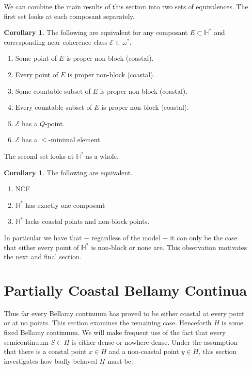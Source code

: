 \documentclass[12pt]{article}
\theoremstyle{plain}
\theoremstyle{definition}
\newtheorem{corollary}[theorem]{Corollary}
\newcommand{\W}{\ensuremath{\omega}}
\newcommand{\HH}{\ensuremath{\mathbb H}}
\newcommand{\0}{\ensuremath{\varnothing}}
\newcommand{\sE}{\ensuremath{\mathscr E}}
\newcommand{\cE}{\ensuremath{\mathcal E}}
\begin{document}
	We can combine the main results of this section into two sets of equivalences. The first set looks at each composant separately.
	
	\begin{corollary}
		The following are equivalent for any composant $E \subset \HH^*$ and corresponding near coherence class $\sE \subset \W^*$.
		\begin{enumerate}
			
			\item Some point of $E$ is proper non-block (coastal).
			
			\item Every point of $E$ is proper non-block (coastal).
			
			\item Some countable subset of $E$ is proper non-block (coastal).
			
			\item Every countable subset of $E$ is proper non-block (coastal).
			
			\item $\cE$ has a $Q$-point.
			
			\item $\cE$ has a $\le$-minimal element.
			
		\end{enumerate}
	\end{corollary}
	
	The second set looks at $\HH^*$ as a whole.
	
	\begin{corollary}
		The following are equivalent.
		\begin{enumerate}
			\item NCF
			\item $\HH^*$ has exactly one composant
			\item $\HH^*$ lacks coastal points and non-block points.
		\end{enumerate}
	\end{corollary}
	
	In particular we have that $-$ regardless of the model $-$ it can only be the case that either every point of $\HH^*$ is non-block or none are. This observation motivates the next and final section.
	
	

	
	\section{Partially Coastal Bellamy Continua}
	\noindent
	Thus far every Bellamy continuum has proved to be either coastal at every point or at no points. This section examines the remaining case. 
	Henceforth $H$ is some fixed Bellamy continuum. We will make frequent use of the fact that every semicontinuum $S \subset H$ is either dense or nowhere-dense. 
	Under the assumption that there is a coastal point $x \in H$  and a non-coastal point $y \in H$, 
	this section investigates how badly behaved $H$ must be. 
	
\end{document}
